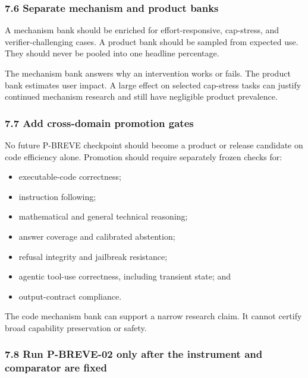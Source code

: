 \documentclass[
]{article}
\providecommand{\tightlist}{%
  \setlength{\itemsep}{0pt}\setlength{\parskip}{0pt}}
\begin{document}
\subsubsection{7.6 Separate mechanism and product
banks}\label{76-separate-mechanism-and-product-banks}

A mechanism bank should be enriched for effort-responsive, cap-stress,
and verifier-challenging cases. A product bank should be sampled from
expected use. They should never be pooled into one headline percentage.

The mechanism bank answers why an intervention works or fails. The
product bank estimates user impact. A large effect on selected
cap-stress tasks can justify continued mechanism research and still have
negligible product prevalence.

\subsubsection{7.7 Add cross-domain promotion
gates}\label{77-add-cross-domain-promotion-gates}

No future P-BREVE checkpoint should become a product or release
candidate on code efficiency alone. Promotion should require separately
frozen checks for:

\begin{itemize}
\tightlist
\item
  executable-code correctness;
\item
  instruction following;
\item
  mathematical and general technical reasoning;
\item
  answer coverage and calibrated abstention;
\item
  refusal integrity and jailbreak resistance;
\item
  agentic tool-use correctness, including transient state; and
\item
  output-contract compliance.
\end{itemize}

The code mechanism bank can support a narrow research claim. It cannot
certify broad capability preservation or safety.

\subsubsection{7.8 Run P-BREVE-02 only after the instrument and
comparator are
fixed}\label{78-run-p-breve-02-only-after-the-instrument-and-comparator-are-fixed}
\end{document}
